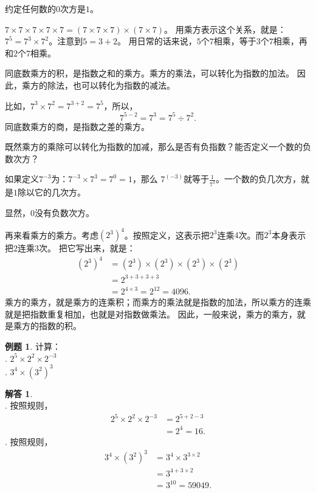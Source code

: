 \documentclass[12pt,UTF8]{ctexbook}
\theoremstyle{definition}
\newtheorem{et}{例题}[section]
\newtheorem*{so}{解答}
\theoremstyle{plain}
\begin{document}
约定任何数的$0$次方是$1$。

$7\times 7\times 7\times 7\times 7 = (7\times 7\times 7)\times (7\times 7)$。
用乘方表示这个关系，就是：$7^5 = 7^3 \times 7^2$。注意到$5 = 3 + 2$。
用日常的话来说，$5$个$7$相乘，等于$3$个$7$相乘，再和$2$个$7$相乘。

同底数乘方的积，是指数之和的乘方。乘方的乘法，可以转化为指数的加法。
因此，乘方的除法，也可以转化为指数的减法。

比如，$7^3 \times 7^2 = 7^{3+2} = 7^5$，所以，
$$7^{5-2} = 7^3 = 7^5 \div 7^2.$$
同底数乘方的商，是指数之差的乘方。

既然乘方的乘除可以转化为指数的加减，那么是否有负指数？能否定义一个数的负数次方？

如果定义$7^{-3}$为：$7^{-3} \times 7^3 = 7^{0} = 1$，那么
$7^{(-3)}$就等于$\frac{1}{7^3}$。一个数的负几次方，就是$1$除以它的几次方。

显然，$0$没有负数次方。

再来看乘方的乘方。考虑$\left(2^3\right)^4$。按照定义，这表示把$2^3$连乘$4$次。而$2^3$本身表示把$2$连乘$3$次。
把它写出来，就是：
\begin{align*}
    \left(2^3\right)^4 &= \left(2^3\right) \times \left(2^3\right) \times \left(2^3\right) \times \left(2^3\right) \\
    &= 2^{3+3+3+3} \\
    &= 2^{4\times 3} = 2^{12} = 4096.
\end{align*}
乘方的乘方，就是乘方的连乘积；而乘方的乘法就是指数的加法，所以乘方的连乘就是把指数重复相加，也就是对指数做乘法。
因此，一般来说，乘方的乘方，就是乘方的指数的积。

\begin{et}
    计算：\\
    . $2^{5} \times 2^2 \times 2^{-3}$ \\
    . $3^4 \times \left(3^2\right)^3$ 

\end{et}

\begin{so}
    \mbox{} \\
    . 按照规则，
    \begin{align*}
        2^{5} \times 2^2 \times 2^{-3} &= 2^{5+2-3} \\
        &= 2^4 = 16.
    \end{align*}
    . 按照规则，
    \begin{align*}
        3^4 \times \left(3^2\right)^3 &= 3^4 \times 3^{3\times 2} \\
        &= 3^{4 + 3\times 2}  \\
        &= 3^10 = 59049.
    \end{align*}
\end{so}
\end{document}
